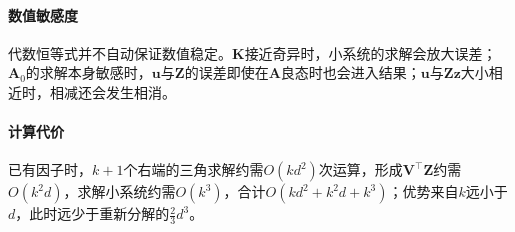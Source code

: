 \paragraph{数值敏感度}
代数恒等式并不自动保证数值稳定。$\bm K$接近奇异时，小系统的求解会放大误差；$\bm A_0$的求解本身敏感时，$\bm u$与$\bm Z$的误差即使在$\bm A$良态时也会进入结果；$\bm u$与$\bm Z\bm z$大小相近时，相减还会发生相消。

\paragraph{计算代价}
已有因子时，$k+1$个右端的三角求解约需$O(kd^2)$次运算，形成$\bm V^\top\bm Z$约需$O(k^2d)$，求解小系统约需$O(k^3)$，合计$O(kd^2+k^2d+k^3)$；优势来自$k$远小于$d$，此时远少于重新分解的$\tfrac23d^3$。
